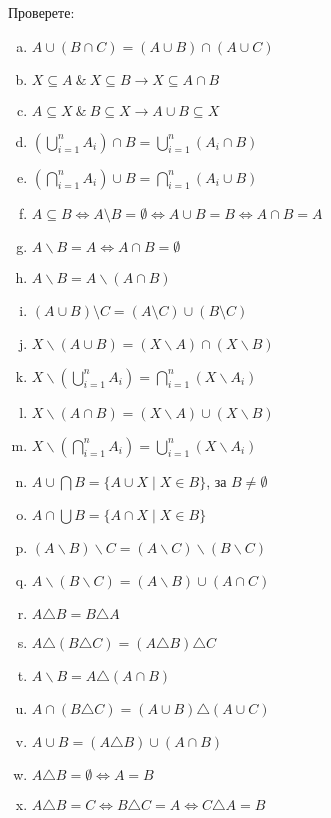 \begin{problem}
  Проверете:
\begin{enumerate}[a)]
  \item
    $A\cup(B\cap C) = (A\cup B)\cap(A\cup C)$
  \item
    $X\subseteq A\ \&\ X\subseteq B \rightarrow X\subseteq A\cap B$
  \item
    $A\subseteq X\ \&\ B\subseteq X \rightarrow A\cup B\subseteq X$
  \item
    $(\bigcup^{n}_{i=1} A_i) \cap B = \bigcup^{n}_{i=1} (A_i \cap B)$
  \item
    $(\bigcap^{n}_{i=1} A_i) \cup B = \bigcap^{n}_{i=1} (A_i \cup B)$
  \item
    $A\subseteq B \iff A\setminus B = \emptyset \iff A\cup B = B \iff A\cap B = A$
  \item
    $A\backslash B = A \iff A\cap B = \emptyset$
  \item
    $A\backslash B = A\backslash (A\cap B)$
  \item
    $(A\cup B)\setminus C = (A\setminus C) \cup (B\setminus C)$
  \item
    $X\backslash (A\cup B) = (X\backslash A)\cap(X\backslash B)$
  \item
    $X\backslash(\bigcup^{n}_{i=1} A_i) = \bigcap^{n}_{i=1} (X\backslash A_i)$
  \item
    $X\backslash (A\cap B) = (X\backslash A)\cup(X\backslash B)$
  \item
    $X\backslash(\bigcap^{n}_{i=1} A_i) = \bigcup^{n}_{i=1} (X\backslash A_i)$
  \item
    $A\cup\bigcap B = \{A\cup X\mid X\in B\}$, за $B\neq\emptyset$
  \item
    $A\cap\bigcup B = \{A\cap X\mid X\in B\}$
  \item
    $(A\backslash B)\backslash C = (A\backslash C)\backslash(B \backslash C)$
  \item
    $A\backslash (B\backslash C) = (A\backslash B) \cup (A\cap C)$
  \item
    $A\triangle B = B\triangle A$
  \item
    $A\triangle(B\triangle C) = (A\triangle B)\triangle C$
  \item
    $A\backslash B = A\triangle(A\cap B)$
  \item
    $A\cap(B\triangle C) = (A\cup B)\triangle(A\cup C)$
  \item
    $A\cup B = (A\triangle B)\cup(A\cap B)$
  \item
    $A\triangle B = \emptyset \iff A = B$
  \item
    $A\triangle B = C \iff B\triangle C = A \iff C\triangle A = B$
  \end{enumerate}
\end{problem}

